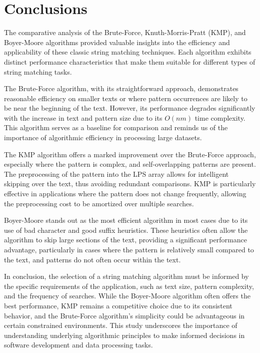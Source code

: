 \documentclass{article}
\begin{document}

\section{Conclusions}

The comparative analysis of the Brute-Force, Knuth-Morris-Pratt (KMP), and Boyer-Moore algorithms provided valuable insights into the efficiency and applicability of these classic string matching techniques. Each algorithm exhibits distinct performance characteristics that make them suitable for different types of string matching tasks.

The Brute-Force algorithm, with its straightforward approach, demonstrates reasonable efficiency on smaller texts or where pattern occurrences are likely to be near the beginning of the text. However, its performance degrades significantly with the increase in text and pattern size due to its $O(nm)$ time complexity. This algorithm serves as a baseline for comparison and reminds us of the importance of algorithmic efficiency in processing large datasets.

The KMP algorithm offers a marked improvement over the Brute-Force approach, especially where the pattern is complex, and self-overlapping patterns are present. The preprocessing of the pattern into the LPS array allows for intelligent skipping over the text, thus avoiding redundant comparisons. KMP is particularly effective in applications where the pattern does not change frequently, allowing the preprocessing cost to be amortized over multiple searches.

Boyer-Moore stands out as the most efficient algorithm in most cases due to its use of bad character and good suffix heuristics. These heuristics often allow the algorithm to skip large sections of the text, providing a significant performance advantage, particularly in cases where the pattern is relatively small compared to the text, and patterns do not often occur within the text.

In conclusion, the selection of a string matching algorithm must be informed by the specific requirements of the application, such as text size, pattern complexity, and the frequency of searches. While the Boyer-Moore algorithm often offers the best performance, KMP remains a competitive choice due to its consistent behavior, and the Brute-Force algorithm's simplicity could be advantageous in certain constrained environments. This study underscores the importance of understanding underlying algorithmic principles to make informed decisions in software development and data processing tasks.
\end{document}
